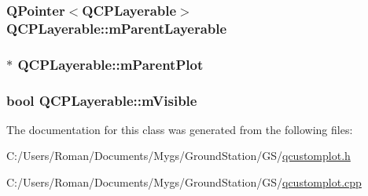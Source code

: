 \subsubsection[{m\+Parent\+Layerable}]{\setlength{\rightskip}{0pt plus 5cm}Q\+Pointer$<${\bf Q\+C\+P\+Layerable}$>$ Q\+C\+P\+Layerable\+::m\+Parent\+Layerable\hspace{0.3cm}{\ttfamily [protected]}}\label{class_q_c_p_layerable_a3291445a980053e2d17a21d15957624e}
\hypertarget{class_q_c_p_layerable_aa2a528433e44db02b8aef23c1f9f90ed}{}
\subsubsection[{m\+Parent\+Plot}]{$\ast$ Q\+C\+P\+Layerable\+::m\+Parent\+Plot\hspace{0.3cm}{\ttfamily [protected]}}\label{class_q_c_p_layerable_aa2a528433e44db02b8aef23c1f9f90ed}
\hypertarget{class_q_c_p_layerable_a62e3aed8427d6ce3ccf716f285106cb3}{}
\subsubsection[{m\+Visible}]{\setlength{\rightskip}{0pt plus 5cm}bool Q\+C\+P\+Layerable\+::m\+Visible\hspace{0.3cm}{\ttfamily [protected]}}\label{class_q_c_p_layerable_a62e3aed8427d6ce3ccf716f285106cb3}


The documentation for this class was generated from the following files\+:\begin{DoxyCompactItemize}
\item 
C\+:/\+Users/\+Roman/\+Documents/\+Mygs/\+Ground\+Station/\+G\+S/\hyperlink{qcustomplot_8h}{qcustomplot.\+h}\item 
C\+:/\+Users/\+Roman/\+Documents/\+Mygs/\+Ground\+Station/\+G\+S/\hyperlink{qcustomplot_8cpp}{qcustomplot.\+cpp}\end{DoxyCompactItemize}
